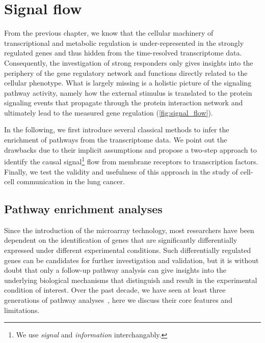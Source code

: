 \chapter{Signal flow}
\label{chap:flow}

From the previous chapter, we know that the cellular machinery of 
transcriptional and metabolic regulation is under-represented in the strongly 
regulated genes and thus hidden from the time-resolved transcriptome data. 
Consequently, the investigation of strong responders only gives insights into
the periphery of the gene regulatory network and functions directly related
to the cellular phenotype. What is largely missing is a holistic picture of
the signaling pathway activity, namely how the external stimulus is translated
to the protein signaling events that propagate through the protein interaction
network and ultimately lead to the measured gene regulation (\ref{fig:signal_flow}).

In the following, we first introduce several classical methods to infer the
enrichment of pathways from the transcriptome data. We point out the drawbacks
due to their implicit assumptions and propose a two-step approach to identify the
causal signal\footnote{We use \emph{signal} and \emph{information} interchangably.} 
flow from membrane receptors to transcription factors. Finally,
we test the validity and usefulness of this approach in the study of cell-cell communication in the lung
cancer.

\section{Pathway enrichment analyses}
Since the introduction of the microarray technology, 
most researchers have been dependent on the identification
of genes that are significantly differentially expressed
under different experimental conditions.
Such differentially regulated genes can be candidates for 
further investigation and validation, but it is without
doubt that only a follow-up
pathway analysis can give insights into the underlying 
biological mechanisms that distinguish and result in 
the experimental condition of interest. Over the past decade, we have seen at least 
three generations of pathway analyses~\citep{Khatri2012}, here we discuss 
their core features and limitations.

